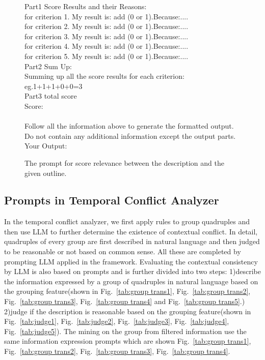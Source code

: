 \begin{figure}[htbp]
\begin{tcolorbox}
Part1 Score Results and their Reasons:\\
for criterion 1. My result is: add (0 or 1).Because:....\\
for criterion 2. My result is: add (0 or 1).Because:....\\
for criterion 3. My result is: add (0 or 1).Because:....\\
for criterion 4. My result is: add (0 or 1).Because:....\\
for criterion 5. My result is: add (0 or 1).Because:....\\
Part2 Sum Up:\\
Summing up all the score results for each criterion:\\
eg.1+1+1+0+0=3\\
Part3 total score\\
Score: \\
\\
Follow all the information above to generate the formatted output.\\
Do not contain any additional information except the output parts.\\
Your Output:\\
\end{tcolorbox}
\caption{The prompt for score relevance between the description and the given outline.}
\label{tab:relevance}
\end{figure}



\subsection{Prompts in Temporal Conflict Analyzer}
In the temporal conflict analyzer, we first apply rules to group quadruples and then use LLM to further determine the existence of contextual conflict. In detail, quadruples of every group are first described in natural language and then judged to be reasonable or not based on common sense. All these are completed by prompting LLM applied in the framework. Evaluating the contextual consistency by LLM is also based on prompts and is further divided into two steps: 1)describe the information expressed by a group of quadruples in natural language based on the grouping feature(shown in Fig.~\ref{tab:group trans1}, Fig.~\ref{tab:group trans2}, Fig.~\ref{tab:group trans3}, Fig.~\ref{tab:group trans4} and Fig.~\ref{tab:group trans5}.)
2)judge if the description is reasonable based on the grouping feature(shown in Fig.~\ref{tab:judge1}, Fig.~\ref{tab:judge2}, Fig.~\ref{tab:judge3}, Fig.~\ref{tab:judge4}, Fig.~\ref{tab:judge5}). The mining on the group from filtered information use the same information expression prompts which are shown Fig.~\ref{tab:group trans1}, Fig.~\ref{tab:group trans2}, Fig.~\ref{tab:group trans3}, Fig.~\ref{tab:group trans4}.

